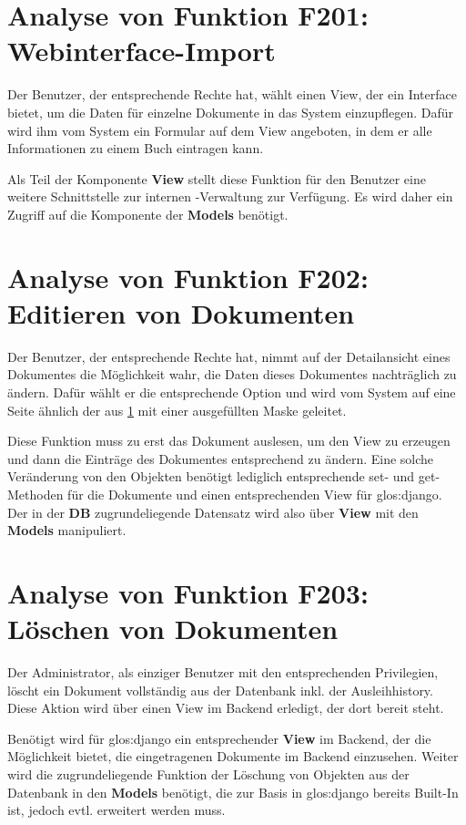 \section{Analyse von Funktion F201: Webinterface-Import}
\label{f:201}
Der Benutzer, der entsprechende Rechte hat, wählt einen View, der ein Interface
bietet, um die Daten für einzelne Dokumente in das System einzupflegen. Dafür
wird ihm vom System ein Formular auf dem View angeboten, in dem er alle
Informationen zu einem Buch eintragen kann.


Als Teil der Komponente \textbf{View} stellt diese Funktion für den
Benutzer eine weitere Schnittstelle zur internen \BibTeX -Verwaltung zur Verfügung. Es wird
daher ein Zugriff auf die Komponente der \textbf{Models} benötigt.

\section{Analyse von Funktion F202: Editieren von Dokumenten}
Der Benutzer, der entsprechende Rechte hat, nimmt auf der Detailansicht eines
Dokumentes die Möglichkeit wahr, die Daten dieses Dokumentes nachträglich zu
ändern. Dafür wählt er die entsprechende Option und wird vom System auf eine
Seite ähnlich der aus \ref{f:201}  mit einer ausgefüllten Maske
geleitet.

Diese Funktion muss zu erst das Dokument auslesen, um den View zu erzeugen und
dann die Einträge des Dokumentes entsprechend zu ändern. Eine solche Veränderung
von den Objekten benötigt lediglich entsprechende set- und get-Methoden für die
Dokumente und einen entsprechenden View für \gls{glos:django}. Der in der
\textbf{DB} zugrundeliegende Datensatz wird also über \textbf{View} mit
den \textbf{Models} manipuliert. 

\section{Analyse von Funktion F203: Löschen von Dokumenten}
Der Administrator, als einziger Benutzer mit den entsprechenden Privilegien,
löscht ein Dokument vollständig aus der Datenbank inkl. der Ausleihhistory.
Diese Aktion wird über einen View im Backend erledigt, der dort bereit steht.


Benötigt wird für \gls{glos:django} ein entsprechender \textbf{View} im Backend, der die
Möglichkeit bietet, die eingetragenen Dokumente im Backend einzusehen. Weiter
wird die zugrundeliegende Funktion der Löschung von Objekten aus der Datenbank
in den \textbf{Models} benötigt, die zur Basis in \gls{glos:django} bereits Built-In ist,
jedoch evtl. erweitert werden muss.

